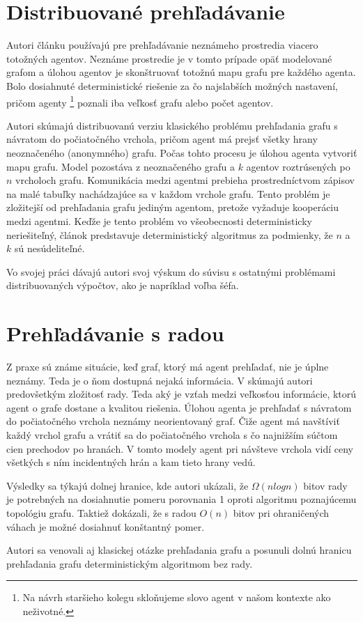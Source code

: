 \section{Distribuované prehľadávanie}
Autori článku \cite{DEA} používajú pre prehľadávanie neznámeho prostredia
viacero totožných agentov. Neznáme prostredie je v tomto prípade opäť
modelované grafom a úlohou agentov je skonštruovať totožnú mapu grafu pre
každého agenta. Bolo dosiahnuté deterministické riešenie za čo najslabších možných
nastavení, pričom agenty \footnote{Na návrh staršieho kolegu skloňujeme
slovo agent v našom kontexte ako neživotné.} poznali iba veľkosť grafu alebo
počet agentov.

Autori skúmajú distribuovanú verziu
klasického problému prehľadania grafu s návratom do počiatočného vrchola,
pričom agent má prejsť všetky hrany neoznačeného (anonymného) grafu. Počas
tohto procesu je úlohou agenta vytvoriť mapu grafu. Model pozostáva z
neoznačeného grafu a $k$ agentov roztrúsených po $n$ vrcholoch grafu.
Komunikácia medzi agentmi prebieha prostredníctvom zápisov na malé tabuľky
nachádzajúce sa v každom vrchole grafu. Tento problém je zložitejší od
prehľadania grafu jediným agentom, pretože vyžaduje kooperáciu medzi
agentmi. Keďže je tento problém vo všeobecnosti deterministicky
neriešiteľný, článok predstavuje deterministický algoritmus za podmienky, že
$n$ a $k$ sú nesúdeliteľné.

Vo svojej práci dávajú autori
svoj výskum do súvisu s ostatnými problémami distribuovaných výpočtov, ako
je napríklad voľba šéfa.

\section{Prehľadávanie s radou}
Z praxe sú známe situácie, keď graf, ktorý má agent prehľadať, nie je úplne
neznámy. Teda je o ňom dostupná nejaká informácia. V \cite{Kral} skúmajú
autori predovšetkým zložitosť rady. Teda aký je vzťah medzi veľkosťou
informácie, ktorú agent o grafe dostane a kvalitou riešenia. Úlohou agenta
je prehľadať s návratom do počiatočného vrchola neznámy neorientovaný graf.
Čiže agent má navštíviť každý vrchol grafu a vrátiť sa do počiatočného
vrchola s čo najnižším súčtom cien prechodov po hranách. V tomto modely
agent pri návšteve vrchola vidí ceny všetkých s ním incidentných hrán a kam
tieto hrany vedú.

Výsledky sa týkajú dolnej hranice, kde autori ukázali, že $\Omega (n log n)$
bitov rady je potrebných na dosiahnutie pomeru porovnania 1 oproti algoritmu
poznajúcemu topológiu grafu. Taktiež dokázali, že s radou $O(n)$ bitov pri
ohraničených váhach je možné dosiahnuť konštantný pomer.

Autori sa venovali aj klasickej otázke prehľadania grafu a posunuli dolnú
hranicu prehľadania grafu deterministickým algoritmom bez rady.
